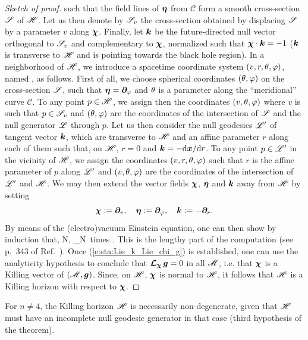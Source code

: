 \begin{proof}[Sketch of proof]
such that the field lines of $\bm{\eta}$ from $\mathscr{C}$ form
a smooth cross-section $\mathscr{S}$ of $\mathscr{H}$. Let us then denote by $\mathscr{S}_v$ the
cross-section obtained by displacing $\mathscr{S}$ by a parameter $v$ along $\bm{\chi}$.
Finally, let $\bm{k}$ be the future-directed null vector orthogonal to $\mathscr{S}_v$ and complementary
to $\bm{\chi}$, normalized such that $\bm{\chi}\cdot\bm{k} = -1$ ($\bm{k}$ is
transverse to $\mathscr{H}$ and is pointing towards the black hole region).
In a neighborhood of $\mathscr{H}$, we introduce a spacetime coordinate system $(v,r,\theta,\varphi)$,
named , as follows.
First of all, we choose spherical coordinates $(\theta,\varphi)$ on the cross-section
$\mathscr{S}$, such that $\bm{\eta} = \bm{\partial}_\varphi$ and $\theta$ is a parameter along
the ``meridional'' curve $\mathscr{C}$. To any point $p\in\mathscr{H}$, we assign
then the coordinates $(v,\theta,\varphi)$ where $v$ is such that $p\in \mathscr{S}_v$
and $(\theta,\varphi)$ are the coordinates
of the intersection of $\mathscr{S}$ and the null generator $\mathscr{L}$ through $p$.
Let us then consider the null geodesics $\mathscr{L}'$
of tangent vector $\bm{k}$, which are transverse to $\mathscr{H}$ and an affine parameter
$r$ along each of them such that, on $\mathscr{H}$, $r=0$ and $\bm{k} = - \mathrm{d}{\bm{x}}/\mathrm{d} r$.
To any point $p\in \mathscr{L}'$ in the vicinity of $\mathscr{H}$, we assign the coordinates $(v,r,\theta,\varphi)$
such that $r$ is the affine parameter of $p$ along $\mathscr{L}'$ and $(v,\theta,\varphi)$
are the coordinates of the intersection of $\mathscr{L}'$ and $\mathscr{H}$. We may then extend
the vector fields $\bm{\chi}$, $\bm{\eta}$ and $\bm{k}$ away from $\mathscr{H}$ by setting
\[
    \bm{\chi} := \bm{\partial}_v,\quad
    \bm{\eta} := \bm{\partial}_\varphi,\quad
    \bm{k} := - \bm{\partial}_r .
\]
By means of the (electro)vacuum Einstein equation, one can then show by induction that,
\be \label{e:sta:Lie_k_Lie_chi_g}
    \forall N\in{}, \quad {}_{N\mbox{\ times}}
    \Lie{\chi}   .
\ee
This is the lengthy part of the computation (see p.~343 of Ref.~\cite{HawkiE73}).
Once (\ref{e:sta:Lie_k_Lie_chi_g})
is established, one can use the analyticity hypothesis to conclude that $\bm{\mathcal{L}}_{\bm{\chi}}\, \bm{g} = 0$
in all $\mathscr{M}$, i.e. that $\bm{\chi}$ is a Killing vector of $(\mathscr{M},\bm{g})$. Since, on $\mathscr{H}$,
$\bm{\chi}$ is normal to $\mathscr{H}$, it follows that $\mathscr{H}$ is a Killing horizon
with respect to $\bm{\chi}$.
\end{proof}

\begin{remark}
For $n\neq 4$, the Killing horizon $\mathscr{H}$ is necessarily non-degenerate, given
that $\mathscr{H}$ must have an incomplete null geodesic generator in that case
(third hypothesis of the theorem).
\end{remark}

